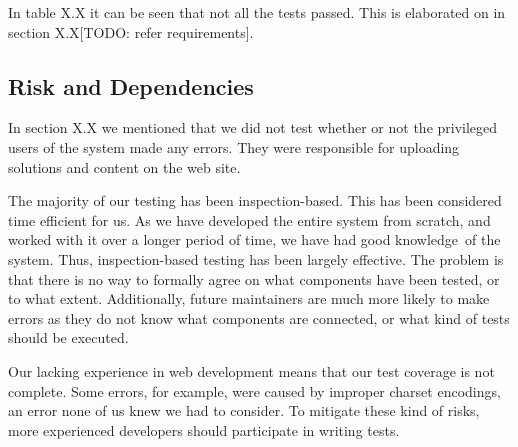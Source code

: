 In table X.X it can be seen that not all the tests passed. This is
elaborated on in section X.X[TODO: refer requirements].
\subsection{Risk and Dependencies}
In section X.X we mentioned that we did not test whether or not the
privileged users of the system made any errors. They were responsible
for uploading solutions and content on the web site.

The majority of our testing has been inspection-based. This has been
considered time efficient for us. As we have developed the entire
system from scratch, and worked with it over a longer period of time,
we have had good knowledge\ of the system. Thus, inspection-based
testing has been largely effective. The problem is that there is no way
to formally agree on what components have been tested, or to what
extent. Additionally, future maintainers are much more likely to make
errors as they do not know what components are connected, or what kind
of tests should be executed.

Our lacking experience in web development means that our test coverage
is not complete. Some errors, for example, were caused by improper
charset encodings, an error none of us knew we had to consider. To
mitigate these kind of risks, more experienced developers should
participate in writing tests.
